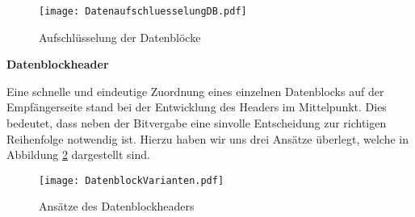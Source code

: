 \begin{figure}[H]
	\centering
	\texttt{[image: DatenaufschluesselungDB.pdf]}
	\caption{Aufschlüsselung der Datenblöcke}
  \label{fig:DatenaufschluesselungDB}
\end{figure}

\textbf{Datenblockheader}

Eine schnelle und eindeutige Zuordnung eines einzelnen Datenblocks auf der
Empfängerseite stand bei der Entwicklung des Headers im Mittelpunkt.
Dies bedeutet, dass neben der Bitvergabe eine sinvolle Entscheidung zur
richtigen Reihenfolge notwendig ist. Hierzu haben wir uns drei Ansätze überlegt,
welche in Abbildung \ref{fig:DatenblockVarianten} dargestellt sind.

\begin{figure}[H]
	\centering
	\texttt{[image: DatenblockVarianten.pdf]}
	\caption{Ansätze des Datenblockheaders}
  \label{fig:DatenblockVarianten}
\end{figure}

